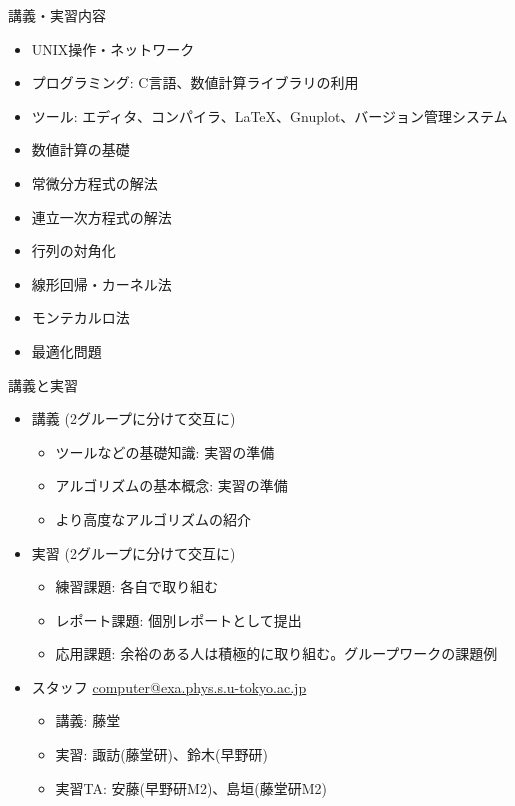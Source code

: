 \documentclass[dvipdfmx]{beamer}
\begin{document}
\begin{frame}[t]{講義・実習内容}
  \begin{itemize}
  \item UNIX操作・ネットワーク
  \item プログラミング: C言語、数値計算ライブラリの利用
  \item ツール: エディタ、コンパイラ、\LaTeX、Gnuplot、バージョン管理システム
  \item 数値計算の基礎
  \item 常微分方程式の解法
  \item 連立一次方程式の解法
  \item 行列の対角化
  \item 線形回帰・カーネル法
  \item モンテカルロ法
  \item 最適化問題
  \end{itemize}
\end{frame}

\begin{frame}[t,fragile]{講義と実習}
  \begin{itemize}
  \item 講義 (2グループに分けて交互に)
    \begin{itemize}
    \item ツールなどの基礎知識: 実習の準備
    \item アルゴリズムの基本概念: 実習の準備
    \item より高度なアルゴリズムの紹介
    \end{itemize}
  \item 実習 (2グループに分けて交互に)
    \begin{itemize}
    \item 練習課題: 各自で取り組む
    \item レポート課題: 個別レポートとして提出
    \item 応用課題: 余裕のある人は積極的に取り組む。グループワークの課題例
    \end{itemize}
  \item スタッフ \href{mailto:computer@exa.phys.s.u-tokyo.ac.jp}{computer@exa.phys.s.u-tokyo.ac.jp}
    \begin{itemize}
    \item 講義: 藤堂
    \item 実習: 諏訪(藤堂研)、鈴木(早野研)
    \item 実習TA: 安藤(早野研M2)、島垣(藤堂研M2)
    \end{itemize}
  \end{itemize}    
\end{frame}
\end{document}
